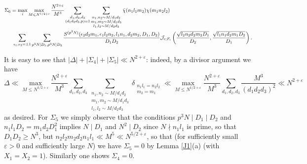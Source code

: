 \documentclass[11pt]{amsart}
\theoremstyle{plain}
\numberwithin{equation}{section}
\theoremstyle{definition}
\renewcommand{\geq}{\geqslant}
\renewcommand{\leq}{\leqslant}
\begin{document}
\begin{displaymath}
\begin{split}
\Sigma_6 =  \max_i & \max_{M \leq N^{1/2+\varepsilon}}\frac{N^{2+\varepsilon} }{M^{3}}\sum_{\substack{d_1, d_2, d_3\\(d_1d_2d_3, p) = 1}}  \sum_{\substack{n_1, n_2 \sim M/d_1d_2\\ m_1, m_2 \sim M/d_1d_3\\ l_1, l_2 \sim M/d_2d_3}}   \bar{\chi}(n_1 l_1m_2)\chi( m_1n_2l_2 )\\
&\hspace{-1cm} \sum_{\epsilon_1, \epsilon_2 = \pm 1} \sum_{p^3N \mid D_1, p^3N \mid D_2  } \frac{S^{(p^3N)}(\epsilon_2 d_2m_1, \epsilon_1 l_2n_2, l_1n_1, d_2m_2, D_1, D_2)}{D_1D_2}\mathcal{J}_{\epsilon;F_i}\left( \frac{\sqrt{l_2n_2 d_2m_2 D_1}}{D_2 }, \frac{\sqrt{l_1n_1 d_2 m_1 D_2}}{D_1}\right).
\end{split}
\end{displaymath}
 
  It is easy to see that $|\Delta| + |\Sigma_4| + |\Sigma_5| \ll N^{2+\varepsilon}$: indeed,   by a divisor argument we have
 $$\Delta \ll  \max_{M \leq N^{1/2+\varepsilon}} \frac{N^{2+\varepsilon} }{M^{3}} \sum_{d_1, d_2, d_3}  \sum_{\substack{n_1, n_2 \sim M/d_1d_2\\ m_1, m_2 \sim M/d_1d_3\\ l_1, l_2 \sim M/d_2d_3}}   \delta_{\substack{n_1l_1 = n_2l_2\\m_2 = m_1}} \ll  \max_{M \leq N^{1/2+\varepsilon}}  \frac{N^{2+\varepsilon}}{M^3} \sum_{d_1, d_2, d_3} \frac{M^3}{(d_1d_2d_3)^2} \ll N^{2+\varepsilon}$$
as desired. For $\Sigma_5$ we simply observe that the conditions $p^3N \mid D_1 \mid D_2$ and $n_1l_1 D_2 = m_1d_2 D_1^2$ implies $N \mid D_1$ and $N^2 \mid D_2$ since $N \nmid n_1l_1$ is prime, so that $D_1D_2 \geq N^3$, but $ n_2l_2m_2d_2n_1l_1 \ll M^{5} \ll N^{5/2+\varepsilon}$, so that (for sufficiently small $\varepsilon > 0$ and sufficiently large $N$) we have $\Sigma_5 = 0$ by Lemma \ref{J1}(a) (with $X_1= X_2 = 1$). Similarly one shows $\Sigma_4 = 0$. \\
\end{document}
